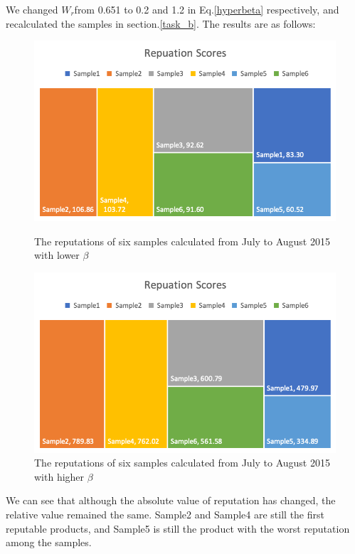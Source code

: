 \documentclass{mcmthesis}
\begin{document}
We changed $W_{r}$from 0.651 to 0.2 and 1.2 in Eq.\ref{hyperbeta} respectively, and recalculated the samples in section.\ref{task_b}. The results are as follows:
\begin{figure}[H] 
\begin{minipage}[t]{0.48\linewidth}	
	\centering 
	\includegraphics[width=1\textwidth]{figures/reputations_n.png} 
	\caption{The reputations of six samples calculated from July to August 2015 with lower $\beta$}
	\label{reputations_n} %
\end{minipage}
\hfill
\begin{minipage}[t]{0.48\linewidth}	
	\centering 
	\includegraphics[width=1\textwidth]{figures/reputations_nn.png} 
	\caption{The reputations of six samples calculated from July to August 2015 with higher $\beta$}
	\label{reputations_nn} %
\end{minipage}
\end{figure}

We can see that although the absolute value of reputation has changed, the relative value remained the same. Sample2 and Sample4 are still the first reputable products, and Sample5 is still the product with the worst reputation among the samples.
\end{document}
